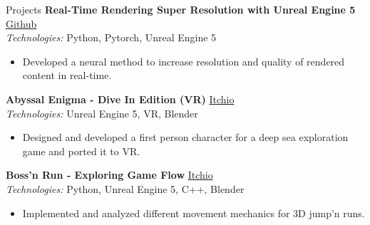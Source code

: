 \documentclass{resume} %
\begin{document}
\begin{rSection}{Projects}
{\bf Real-Time Rendering Super Resolution with Unreal Engine 5} \hfill {\href{https://github.com/BrandnerKasper/URTSR}{Github}} \\
{\small {\em Technologies:} Python, Pytorch, Unreal Engine 5}
\begin{itemize}
    \item \small Developed a neural method to increase resolution and quality of rendered content in real-time.
\end{itemize}

{\bf Abyssal Enigma - Dive In Edition (VR)} \hfill {\href{https://miggli.itch.io/abyssal-enigma/devlog/638746/abyssal-engima-dive-in-edition-vr}{Itchio}} \\
{\small {\em Technologies:} Unreal Engine 5, VR, Blender}
\begin{itemize}
    \item \small Designed and developed a first person character for a deep sea exploration game and ported it to VR.
\end{itemize}

{\bf Boss'n Run - Exploring Game Flow} \hfill {\href{https://brandnerkasper.itch.io/bossn-run}{Itchio}} \\
{\small {\em Technologies:} Python, Unreal Engine 5, C++, Blender}
\begin{itemize}
    \item \small Implemented and analyzed different movement mechanics for 3D jump'n runs.
\end{itemize}


\end{rSection}
\end{document}
